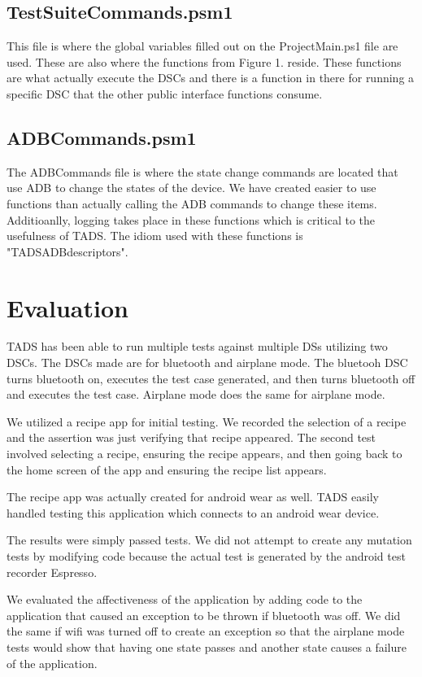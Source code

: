 \subsection{TestSuiteCommands.psm1}

This file is where the global variables filled out on the ProjectMain.ps1 file are used.  These are also where the functions from Figure 1. reside.  These functions are what actually execute the DSCs and there is a function in there for running a specific DSC that the other public interface functions consume.   

\subsection{ADBCommands.psm1}

The ADBCommands file is where the state change commands are located that use ADB to change the states of the device.  We have created easier to use functions than actually calling the ADB commands to change these items.  Additioanlly, logging takes place in these functions which is critical to the usefulness of TADS. The idiom used with these functions is "TADSADBdescriptors".



\section{Evaluation}
TADS has been able to run multiple tests against multiple DSs utilizing two DSCs.  The DSCs made are for bluetooth and airplane mode.  The bluetooh DSC turns bluetooth on, executes the test case generated, and then turns bluetooth off and executes the test case.  Airplane mode does the same for airplane mode.    

We utilized a recipe app for initial testing.  We recorded the selection of a recipe and the assertion was just verifying that recipe appeared.  The second test involved selecting a recipe, ensuring the recipe appears, and then going back to the home screen of the app and ensuring the recipe list appears.  

The recipe app was actually created for android wear as well.  TADS easily handled testing this application which connects to an android wear device.  

The results were simply passed tests.  We did not attempt to create any mutation tests by modifying code because the actual test is generated by the android test recorder Espresso.  

We evaluated the affectiveness of the application by adding code to the application that caused an exception to be thrown if bluetooth was off.  We did the same if wifi was turned off to create an exception so that the airplane mode tests would show that having one state passes and another state causes a failure of the application.  

